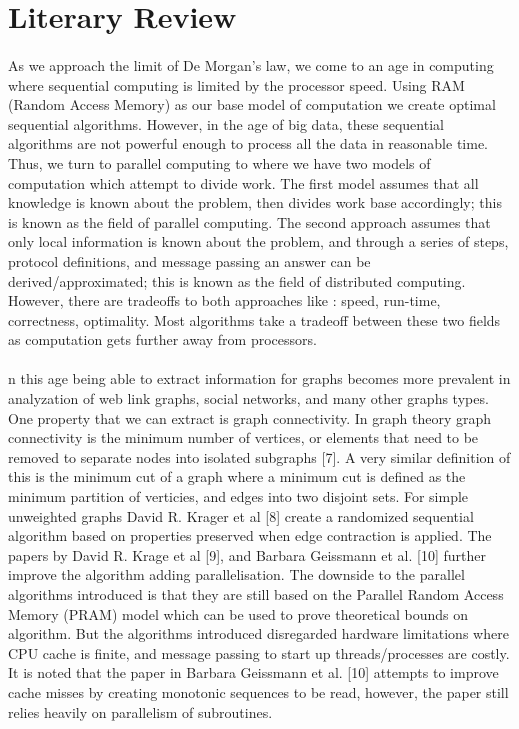 \documentclass[]{article}
\begin{document}
\maketitle

\section{Literary Review}
\paragraph{}
As we approach the limit of De Morgan's law, we come to an age in computing where sequential computing is limited by the processor speed. Using RAM (Random Access Memory) as our base model of computation we create optimal sequential algorithms. However, in the age of big data, these sequential algorithms are not powerful enough to process all the data in reasonable time. Thus, we turn to parallel computing to where we have two models of computation which attempt to divide work. The first model assumes that all knowledge is known about the problem, then divides work base accordingly; this is known as the field of parallel computing. The second approach assumes that only local information is known about the problem, and through a series of steps, protocol definitions, and message passing an answer can be derived/approximated; this is known as the field of distributed computing. However, there are tradeoffs to both approaches like : speed, run-time, correctness, optimality. Most algorithms take a tradeoff between these two fields as computation gets further away from processors.

\paragraph{}
n this age being able to extract information for graphs becomes more prevalent in analyzation of web link graphs, social networks, and many other graphs types. One property that we can extract is graph connectivity. In graph theory graph connectivity is the minimum number of vertices, or elements that need to be removed to separate nodes into isolated subgraphs [7]. A very similar definition of this is the minimum cut of a graph where a minimum cut is defined as the minimum partition of verticies, and edges into two disjoint sets. For simple unweighted graphs David R. Krager et al [8] create a randomized sequential algorithm based on properties preserved when edge contraction is applied. The papers by David R. Krage et al [9], and Barbara Geissmann et al. [10] further improve the algorithm adding parallelisation. The downside to the parallel algorithms introduced is that they are still based on the Parallel Random Access Memory (PRAM) model which can be used to prove theoretical bounds on algorithm. But the algorithms introduced disregarded hardware limitations where CPU cache is finite, and message passing to start up threads/processes are costly. It is noted that the paper in Barbara Geissmann et al. [10] attempts to improve cache misses by creating monotonic sequences to be read, however, the paper still relies heavily on parallelism of
 subroutines.
 
\end{document}
